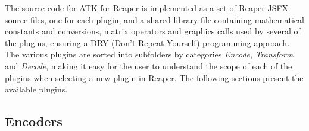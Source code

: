 \documentclass{article}
\begin{document}
The source code for ATK for Reaper is implemented as a set of Reaper JSFX source files, one for each plugin, and a shared library file containing mathematical constants and conversions, matrix operators and graphics calls used by several of the plugins, ensuring a DRY (Don't Repeat Yourself) programming approach.
The various plugins are sorted into subfolders by categories \emph{Encode}, \emph{Transform} and \emph{Decode}, making it easy for the user to understand the scope of each of the plugins when selecting a new plugin in Rea\-per. 
The following sections present the available plugins.


\subsection{Encoders}\label{sec:encoders}

%
\end{document}
